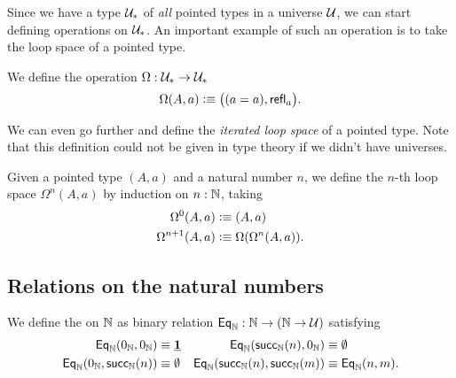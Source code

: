 Since we have a type $\mathcal{U}_\ast$ of \emph{all} pointed types in a universe $\mathcal{U}$, we can start defining operations on $\mathcal{U}_\ast$. An important example of such an operation is to take the loop space of a pointed type.

\begin{defn}
  We define the  operation $\Omega : \mathcal{U}_\ast \to \mathcal{U}_\ast$
  \begin{equation*}
    \Omega(A,a)\vcentcolon\equiv \big((a=a),\mathsf{refl}_{a}\big).
  \end{equation*}
\end{defn}

We can even go further and define the \emph{iterated loop space} of a pointed type. Note that this definition could not be given in type theory if we didn't have universes.

\begin{defn}
  Given a pointed type $(A,a)$ and a natural number $n$, we define the $n$-th loop space $\Omega^n(A,a)$ by induction on $n:{\mathbb{N}}$, taking
  \begin{align*}
    \Omega^0(A,a) & \vcentcolon\equiv (A,a) \\
    \Omega^{n+1}(A,a) & \vcentcolon\equiv \Omega(\Omega^n(A,a)).
  \end{align*}
\end{defn}

\subsection{Relations on the natural numbers}

\begin{defn}\label{defn:obs_nat}
We define the  on ${\mathbb{N}}$ as binary relation $\mathsf{Eq}_{\mathbb{N}}:{\mathbb{N}}\to({\mathbb{N}}\to\mathcal{U})$ satisfying
\begin{align*}
\mathsf{Eq}_{\mathbb{N}}(0_{{\mathbb{N}}},0_{{\mathbb{N}}}) & \equiv \underline{\mathbf{1}} & \mathsf{Eq}_{\mathbb{N}}(\mathsf{succ}_{{\mathbb{N}}}(n),0_{{\mathbb{N}}}) & \equiv \emptyset \\
\mathsf{Eq}_{\mathbb{N}}(0_{{\mathbb{N}}},\mathsf{succ}_{{\mathbb{N}}}(n)) & \equiv \emptyset & \mathsf{Eq}_{\mathbb{N}}(\mathsf{succ}_{{\mathbb{N}}}(n),\mathsf{succ}_{{\mathbb{N}}}(m)) & \equiv \mathsf{Eq}_{\mathbb{N}}(n,m).
\end{align*}
\end{defn}

